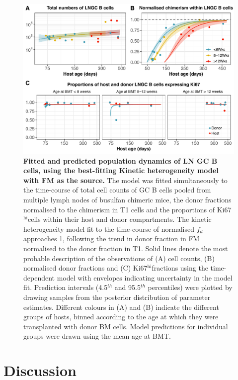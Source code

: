 \documentclass[11pt,onecolumn]{article}
\newcommand{\khi}{Ki67$^\text{hi}$}
\begin{document}
    
    \begin{figure}[h!]
    	\centerline{\includegraphics[scale = 0.85] {Results_LNGC_FM.pdf}}
    		\caption{\small \textbf{Fitted and predicted population dynamics of LN GC B cells, using the best-fitting Kinetic heterogeneity model with FM as the source.}  The model was fitted simultaneously to the  time-course of total cell counts of GC B cells pooled from multiple lymph nodes of busulfan chimeric mice, the donor fractions normalised to the chimerism in T1 cells and the proportions of \khi cells within their host and donor compartments.  The kinetic heterogeneity model fit to the time-course of normalised $f_{d}$  approaches 1, following the trend in donor fraction in FM normalised to the donor fraction in T1. Solid lines denote the most probable description of the observations of (A) cell counts, (B) normalised donor fractions and (C) \khi fractions using the time-dependent model with envelopes indicating uncertainty in the model fit. Prediction intervals (4.5$^{th}$ and 95.5$^{th}$ percentiles) were plotted by drawing samples from the posterior distribution of parameter estimates. Different colours in (A) and (B) indicate the different groups of hosts, binned according to the age at which they were transplanted with donor BM cells. Model predictions for individual groups were drawn using the mean age at BMT.}
    		\label{fig:results_LNGC}
    \end{figure}
	




\section*{Discussion}
\end{document}
